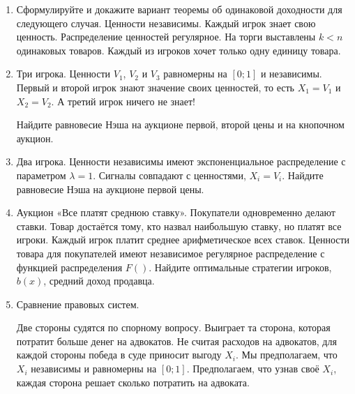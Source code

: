 \begin{enumerate}

\item Сформулируйте и докажите вариант теоремы об одинаковой доходности для следующего случая. Ценности независимы. Каждый игрок знает свою ценность. Распределение ценностей регулярное. На торги выставлены $ k<n $ одинаковых товаров. Каждый из игроков хочет только одну единицу товара.

\item Три игрока. Ценности $ V_{1} $, $ V_{2} $ и $ V_{3} $ равномерны на $ [0;1] $ и независимы. Первый и второй игрок знают значение своих ценностей, то есть $ X_{1}=V_{1} $ и $ X_{2}=V_{2} $. А третий игрок ничего не знает!

Найдите равновесие Нэша на аукционе первой, второй цены и на кнопочном аукцион.


\item Два игрока. Ценности независимы имеют экспоненциальное распределение с параметром $ \lambda=1 $. Сигналы совпадают с ценностями,  $ X_{i}=V_{i} $. Найдите равновесие Нэша на аукционе первой цены. 




\item Аукцион «Все платят среднюю ставку». Покупатели одновременно делают ставки. Товар достаётся тому, кто назвал наибольшую ставку, но платят все игроки. Каждый игрок платит среднее арифметическое всех ставок. Ценности товара для покупателей имеют независимое регулярное распределение с функцией распределения $ F() $. Найдите оптимальные стратегии игроков, $ b(x) $, средний доход продавца.



\item Сравнение правовых систем.

Две стороны судятся по спорному вопросу. Выиграет та сторона, которая потратит больше денег на адвокатов. Не считая расходов на адвокатов, для каждой стороны победа в суде приносит выгоду $ X_{i} $. Мы предполагаем, что $ X_{i} $ независимы и равномерны на $ [0;1] $. Предполагаем, что узнав своё $ X_{i} $, каждая сторона решает сколько потратить на адвоката.


\end{enumerate}

